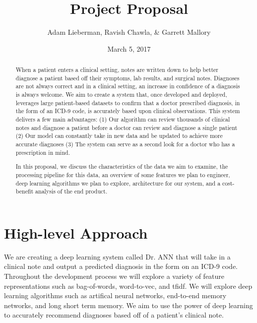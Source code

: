 \documentclass{article}
\author{Adam Lieberman, Ravish Chawla, \& Garrett Mallory}
\date{March 5, 2017}
\title{Project Proposal}
\begin{document}
  
\maketitle
\begin{abstract}
    When a patient enters a clinical setting, notes are written down to help better diagnose a patient based off their symptoms, lab results, and surgical notes. Diagnoses are not always correct and in a clinical setting, an increase in confidence of a diagnosis is always welcome. We aim to create a system that, once developed and deployed, leverages large patient-based datasets to confirm that a doctor prescribed diagnosis, in the form of an ICD-9 code, is accurately based upon clinical observations. This system delivers a few main advantages: (1) Our algorithm can review thousands of clinical notes and diagnose a patient before a doctor can review and diagnose a single patient (2) Our model can constantly take in new data and be updated to achieve more accurate diagnoses (3) The system can serve as a second look for a doctor who has a prescription in mind. 

In this proposal, we discuss the characteristics of the data we aim to examine, the processing pipeline for this data, an overview of some features we plan to engineer, deep learning algorithms we plan to explore, architecture for our system, and a cost-benefit analysis of the end product. 
\end{abstract}


\section{High-level Approach}
We are creating a deep learning system called Dr. ANN that will take in a clinical note and output a predicted diagnosis in the form on an ICD-9 code. Throughout the development process we will explore a variety of feature representations such as bag-of-words, word-to-vec, and tfidf. We will explore deep learning algorithms such as artifical neural networks, end-to-end memory networks, and long short term memory. We aim to use the power of deep learning to accurately recommend diagnoses based off of a patient's clinical note.
\end{document}
